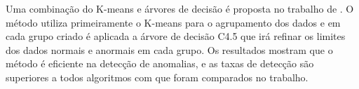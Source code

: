 \indent Uma combinação do K-means e árvores de decisão é proposta no trabalho de . O método utiliza primeiramente o K-means para o agrupamento dos dados e em cada grupo criado é aplicada a árvore de decisão C4.5 que irá refinar os limites dos dados normais e anormais em cada grupo. Os resultados mostram que o método é eficiente na detecção de anomalias, e as taxas de detecção são superiores a todos algoritmos com que foram comparados no trabalho.
